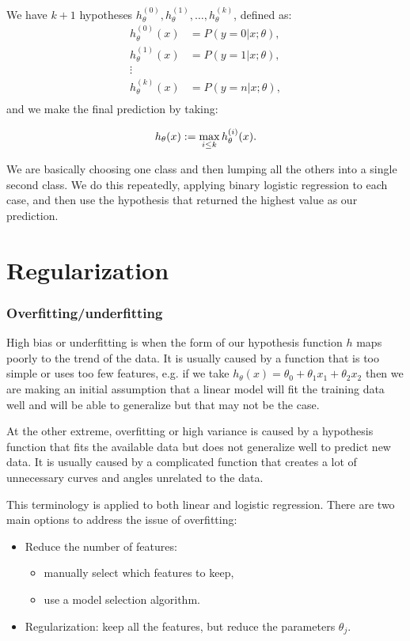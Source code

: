 \documentclass[a4paper,11pt]{report}
\begin{document}
We have $k+1$ hypotheses $h_\theta^{(0)}, h_\theta^{(1)}, \ldots, h_\theta^{(k)}$, defined as:
\begin{align*}
h_\theta^{(0)}(x) &= P(y = 0 | x ; \theta), \\
h_\theta^{(1)}(x) &= P(y = 1 | x ; \theta), \\
\vdots &\\
h_\theta^{(k)}(x) &= P(y = n | x ; \theta), \\
\end{align*}
and we make the final prediction by taking:

$$h_\theta(x) := \max_{i\leq k} h_\theta ^{(i)}(x). \\$$

We are basically choosing one class and then lumping all the others into a single second class. We do this repeatedly, applying binary logistic regression to each case, and then use the hypothesis that returned the highest value as our prediction.


\section{Regularization}

\subsubsection*{Overfitting/underfitting}

High bias or underfitting is when the form of our hypothesis function $h$ maps poorly to the trend of the data. It is usually caused by a function that is too simple or uses too few features, e.g. if we take $h_\theta(x) = \theta_0 + \theta_1x_1 + \theta_2x_2$ then we are making an initial assumption that a linear model will fit the training data well and will be able to generalize but that may not be the case.

At the other extreme, overfitting or high variance is caused by a hypothesis function that fits the available data but does not generalize well to predict new data. It is usually caused by a complicated function that creates a lot of unnecessary curves and angles unrelated to the data.

This terminology is applied to both linear and logistic regression. There are two main options to address the issue of overfitting:

\begin{itemize}
\item Reduce the number of features:
    \begin{itemize}
      \item manually select which features to keep,
      \item use a model selection algorithm.
    \end{itemize}

\item Regularization: keep all the features, but reduce the parameters $\theta_j$.
\end{itemize}
\end{document}
